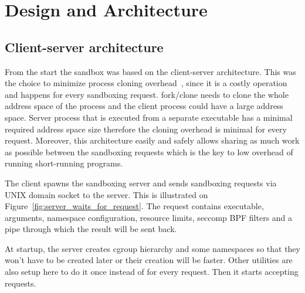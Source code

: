 \documentclass[en]{pracamgr}
\begin{document}
\chapter{Design and Architecture}\label{chapter:design}

\section{Client-server architecture}

From the start the sandbox was based on the client-server architecture. This was the choice to minimize process cloning overhead~\cite{redis-latency-generated-by-fork}, since it is a costly operation and happens for every sandboxing request. fork/clone needs to clone the whole address space of the process and the client process could have a large address space. Server process that is executed from a separate executable has a minimal required address space size therefore the cloning overhead is minimal for every request. Moreover, this architecture easily and safely allows sharing as much work as possible between the sandboxing requests which is the key to low overhead of running short-running programs.

The client spawns the sandboxing server and sends sandboxing requests via UNIX domain socket to the server. This is illustrated on Figure~\ref{fig:server_waits_for_request}. The request contains executable, arguments, namespace configuration, resource limits, seccomp BPF filters and a pipe through which the result will be sent back.

At startup, the server creates cgroup hierarchy and some namespaces so that they won't have to be created later or their creation will be faster. Other utilities are also setup here to do it once instead of for every request. Then it starts accepting requests.
\end{document}
